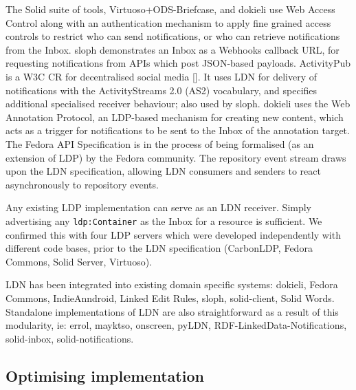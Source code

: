                                     
\par The Solid suite of tools, Virtuoso+ODS-Briefcase, and dokieli use \empty Web Access Control along with an authentication mechanism to apply fine grained access controls to restrict who can send notifications, or who can retrieve notifications from the Inbox. sloph demonstrates an Inbox as a \empty Webhooks callback URL, for requesting notifications from APIs which post JSON-based payloads. \empty ActivityPub is a W3C CR for decentralised social media []. It uses LDN for delivery of notifications with the \empty ActivityStreams 2.0 (AS2) vocabulary, and specifies additional specialised receiver behaviour; also used by sloph. dokieli uses the \empty Web Annotation Protocol, an LDP-based mechanism for creating new content, which acts as a trigger for notifications to be sent to the Inbox of the annotation target. The \empty Fedora API Specification is in the process of being formalised (as an extension of LDP) by the Fedora community. The repository event stream draws upon the LDN specification, allowing LDN consumers and senders to react asynchronously to repository events.

                                    
\par Any existing LDP implementation can serve as an LDN receiver. Simply advertising any {\tt ldp:Container} as the Inbox for a resource is sufficient. We confirmed this with four LDP servers which were developed independently with different code bases, prior to the LDN specification (CarbonLDP, Fedora Commons, Solid Server, Virtuoso).

                                    
\par LDN has been integrated into existing domain specific systems: dokieli, Fedora Commons, IndieAnndroid, Linked Edit Rules, sloph, solid-client, Solid Words. Standalone implementations of LDN are also straightforward as a result of this modularity, ie: errol, mayktso, onscreen, pyLDN, RDF-LinkedData-Notifications, solid-inbox, solid-notifications.
                                
                            

                            
                                \subsection{Optimising implementation}
  \label{optimising-implementation}

                                
                                    
